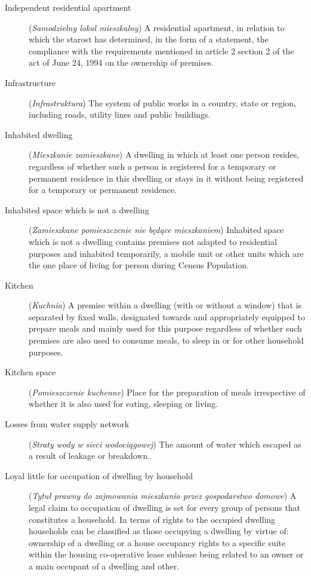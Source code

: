 \documentclass[12pt,a4paper]{article}
\begin{document}
\begin{description}
\item[Independent residential apartment] (\textit{Samodzielny lokal mieszkalny}) A residential apartment, in relation to which the starost has determined, in the form of a statement, the compliance with the requirements mentioned in article 2 section 2 of the act of June 24, 1994 on the ownership of premises.
\item[Infrastructure] (\textit{Infrastruktura}) The system of public works in a country, state or region, including roads, utility lines and public buildings. 
\item[Inhabited dwelling] (\textit{Mieszkanie zamieszkane}) A dwelling in which at least one person resides, regardless of whether such a person is registered for a temporary or permanent residence in this dwelling or stays in it without being registered for a temporary or permanent residence.
\item[Inhabited space which is not a dwelling] (\textit{Zamieszkane pomieszczenie nie będące mieszkaniem}) Inhabited space which is not a dwelling contains premises not adapted to residential purposes and inhabited temporarily,  a mobile unit or other units which are the one place of living for person during Census Population.
\item[Kitchen] (\textit{Kuchnia}) A premise within a dwelling (with or without a window) that is separated by fixed walls, designated towards and appropriately equipped to prepare meals and mainly used for this purpose regardless of whether such premises are also used to consume meals, to sleep in or for other household purposes.
\item[Kitchen space] (\textit{Pomieszczenie kuchenne}) Place for the preparation of meals irrespective of whether it is also used for eating, sleeping or living.
\item[Losses from water supply network] (\textit{Straty wody w sieci wodociągowej}) The amount of water which escaped as a result of leakage or breakdown.
\item[Loyal little for occupation of dwelling by household] (\textit{Tytuł prawny do zajmowania mieszkania przez gospodarstwo domowe}) A legal claim to occupation of dwelling is set for every group of persons that constitutes a household. In terms of rights to the occupied dwelling households can be classified as those occupying a dwelling by virtue of: ownership of a dwelling or a house occupancy rights to a specific suite within the housing co-operative lease sublease being related to an owner or a main occupant of a dwelling and other.

\end{description}
\end{document}
